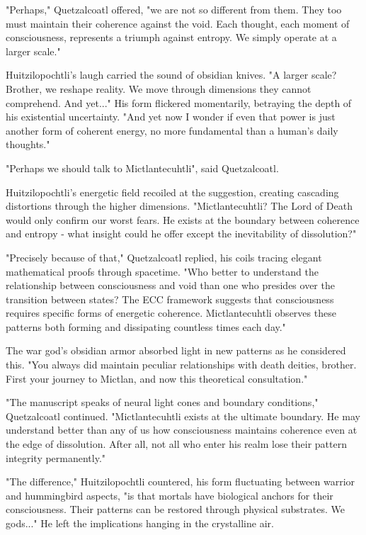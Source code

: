 "Perhaps," Quetzalcoatl offered, "we are not so different from them. They too must maintain their coherence against the void. Each thought, each moment of consciousness, represents a triumph against entropy. We simply operate at a larger scale."

Huitzilopochtli's laugh carried the sound of obsidian knives. "A larger scale? Brother, we reshape reality. We move through dimensions they cannot comprehend. And yet..." His form flickered momentarily, betraying the depth of his existential uncertainty. "And yet now I wonder if even that power is just another form of coherent energy, no more fundamental than a human's daily thoughts."

"Perhaps we should talk to Mictlantecuhtli", said Quetzalcoatl.

Huitzilopochtli's energetic field recoiled at the suggestion, creating cascading distortions through the higher dimensions. "Mictlantecuhtli? The Lord of Death would only confirm our worst fears. He exists at the boundary between coherence and entropy - what insight could he offer except the inevitability of dissolution?"

"Precisely because of that," Quetzalcoatl replied, his coils tracing elegant mathematical proofs through spacetime. "Who better to understand the relationship between consciousness and void than one who presides over the transition between states? The ECC framework suggests that consciousness requires specific forms of energetic coherence. Mictlantecuhtli observes these patterns both forming and dissipating countless times each day."

The war god's obsidian armor absorbed light in new patterns as he considered this. "You always did maintain peculiar relationships with death deities, brother. First your journey to Mictlan, and now this theoretical consultation."

"The manuscript speaks of neural light cones and boundary conditions," Quetzalcoatl continued. "Mictlantecuhtli exists at the ultimate boundary. He may understand better than any of us how consciousness maintains coherence even at the edge of dissolution. After all, not all who enter his realm lose their pattern integrity permanently."

"The difference," Huitzilopochtli countered, his form fluctuating between warrior and hummingbird aspects, "is that mortals have biological anchors for their consciousness. Their patterns can be restored through physical substrates. We gods..." He left the implications hanging in the crystalline air.

